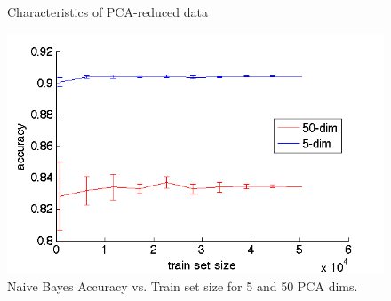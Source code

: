 

\begin{figure}[!ht]
\centering
{}
\caption{Characteristics of PCA-reduced data}
\label{fig:PCA_RED}
\end{figure}



\begin{center}
\begin{figure}[!ht]
\centering
\includegraphics[width=.5\textwidth]{../images/nb_5_vs_50.png}
\caption{Naive Bayes Accuracy vs. Train set size for 5 and 50 PCA dims.}
\label{fig:5_vs_50_pca}
\end{figure}
\end{center}

